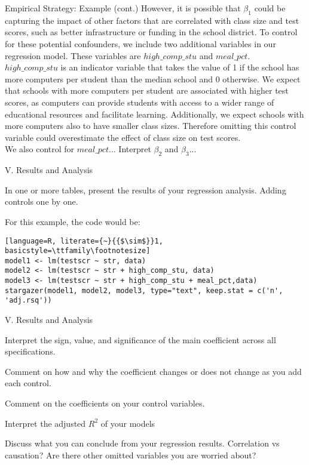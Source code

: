 \documentclass{./../Lectures/div_teaching_slides}
\begin{document}
\begin{frame}{Empirical Strategy: Example (cont.)}
\small \vspace{-0.25em}
However, it is possible that $\beta_1$ could be capturing the impact of other factors that are correlated with class size and test scores, such as better infrastructure or funding in the school district. To control for these potential confounders, we include two additional variables in our regression model. These variables are $high\_comp\_stu$ and $meal\_pct$. \\ \vspace{0.5em}
$high\_comp\_stu$ is an indicator variable that takes the value of 1 if the school has more computers per student than the median school and 0 otherwise. We expect that schools with more computers per student are associated with higher test scores, as computers can provide students with access to a wider range of educational resources and facilitate learning. Additionally, we expect schools with more computers also to have smaller class sizes. Therefore omitting this control variable could overestimate the effect of class size on test scores. \\ \vspace{0.5em}
We also control for $meal\_pct$... Interpret $\beta_2$ and $\beta_3$...
\end{frame}


\begin{frame}[fragile]{V. Results and Analysis}
\begin{witemize}
\item In one or more tables, present the results of your regression analysis. Adding controls one by one.
\item For this example, the code would be:
\end{witemize}
\begin{lstlisting}[language=R, literate={~}{{$\sim$}}1, basicstyle=\ttfamily\footnotesize]
model1 <- lm(testscr ~ str, data)
model2 <- lm(testscr ~ str + high_comp_stu, data)
model3 <- lm(testscr ~ str + high_comp_stu + meal_pct,data)
stargazer(model1, model2, model3, type="text", keep.stat = c('n', 'adj.rsq'))
\end{lstlisting}
\end{frame}

\begin{frame}[fragile]{V. Results and Analysis}
\begin{witemize}
\item Interpret the sign, value, and significance of the main coefficient across all specifications.
\item Comment on how and why the coefficient changes or does not change as you add each control.
\item Comment on the coefficients on your control variables. 
\item Interpret the adjusted $R^2$ of your models
\item Discuss what you can conclude from your regression results. Correlation vs causation? Are there other omitted variables you are worried about?
\end{witemize}
\end{frame}
\end{document}
